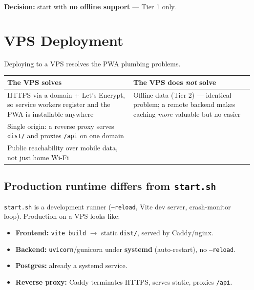 \documentclass[11pt,a4paper]{article}
\begin{document}
\textbf{Decision:} start with \textbf{no offline support} --- Tier 1 only.

\section{VPS Deployment}

Deploying to a VPS resolves the PWA plumbing problems.

\begin{center}
\renewcommand{\arraystretch}{1.3}
\begin{tabularx}{\textwidth}{>{\raggedright\arraybackslash}p{5.5cm} X}
\toprule
\textbf{The VPS solves} & \textbf{The VPS does \emph{not} solve} \\
\midrule
HTTPS via a domain + Let's Encrypt, so service workers register and the PWA is installable anywhere &
Offline data (Tier 2) --- identical problem; a remote backend makes caching \emph{more} valuable but no easier \\
Single origin: a reverse proxy serves \texttt{dist/} and proxies \texttt{/api} on one domain & \\
Public reachability over mobile data, not just home Wi-Fi & \\
\bottomrule
\end{tabularx}
\end{center}

\subsection{Production runtime differs from \texttt{start.sh}}

\texttt{start.sh} is a development runner (\texttt{--reload}, Vite dev server,
crash-monitor loop). Production on a VPS looks like:

\begin{itemize}
  \item \textbf{Frontend:} \texttt{vite build} $\rightarrow$ static \texttt{dist/}, served by Caddy/nginx.
  \item \textbf{Backend:} \texttt{uvicorn}/gunicorn under \textbf{systemd} (auto-restart), no \texttt{--reload}.
  \item \textbf{Postgres:} already a systemd service.
  \item \textbf{Reverse proxy:} Caddy terminates HTTPS, serves static, proxies \texttt{/api}.
\end{itemize}
\end{document}
